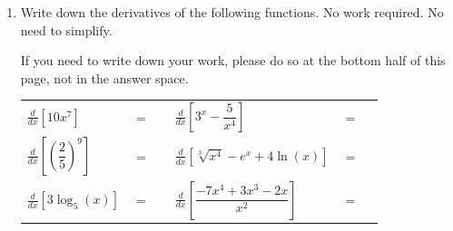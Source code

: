 \documentclass[11pt]{article}
\begin{document}
\begin{enumerate}
\begin{enumerate}
\begin{center}
\begin{tikzpicture}[scale=1.25]
        
    \end{tikzpicture}
    \end{center}

    \begin{center}
        \begin{tabular}{l c r l c r}
            $g'(0)$ & $=$ & \rule[-8pt]{1.5in}{0.4pt} &
            $g'(-1)$ & $=$ & \rule[-8pt]{1.5in}{0.4pt}\\[0.3in]
            $g'(2)$ & $=$ & \rule[-8pt]{1.5in}{0.4pt} & 
            $g'(-3)$ & $=$ & \rule[-8pt]{1.5in}{0.4pt}\\[0.3in]
        \end{tabular} 
\end{center}

\end{enumerate}


\newpage


\item Write down the derivatives of the following functions. No work required. No need to simplify.

If you need to write down your work, please do so at the bottom half of this page, not in the answer space.

\begin{center}
        \begin{tabular}{l c r l c r}
            $\displaystyle\frac{d}{dx}\left[ 10x^7 \right]$ & $=$ & \rule[-8pt]{1.5in}{0.4pt} &
            $\displaystyle\frac{d}{dx}\left[ 3^x-\dfrac{5}{x^4} \right]$ & $=$ & \rule[-8pt]{1.5in}{0.4pt}\\[0.3in]
            $\displaystyle\frac{d}{dx}\left[ \left(\dfrac{2}{5}\right)^9 \right]$ & $=$ & \rule[-8pt]{1.5in}{0.4pt} & 
            $\displaystyle\frac{d}{dx}\left[ \sqrt[3]{x^4}-e^x+4\ln(x)\right]$ & $=$ & \rule[-8pt]{1.5in}{0.4pt}\\[0.3in]
            $\displaystyle\frac{d}{dx}\left[ 3\log_5(x) \right]$ & $=$ & \rule[-8pt]{1.5in}{0.4pt}&
            $\displaystyle\frac{d}{dx}\left[ \dfrac{-7x^4+3x^3-2x}{x^2} \right]$ & $=$ & \rule[-8pt]{1.5in}{0.4pt}\\[0.3in]
        \end{tabular}
        

\end{center}
\end{enumerate}
\end{document}
